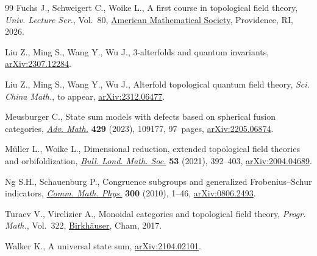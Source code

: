 \begin{thebibliography}{99}
Fuchs J., Schweigert C., Woike L., A first course in topological field theory,
 \textit{Univ. Lecture Ser.}, Vol.~80,
 \href{https://doi.org/10.1090/ulect/080}{American Mathematical Society},
 Providence, RI, 2026.

Liu Z., Ming S., Wang Y., Wu J., 3-alterfolds and quantum invariants,
 \href{http://arxiv.org/abs/2307.12284}{arXiv:2307.12284}.

Liu Z., Ming S., Wang Y., Wu J., Alterfold topological quantum field theory,
 \textit{Sci. China Math.}, {t}o appear,
 \href{http://arxiv.org/abs/2312.06477}{arXiv:2312.06477}.

Meusburger C., State sum models with defects based on spherical fusion
 categories, \href{https://doi.org/10.1016/j.aim.2023.109177}{\textit{Adv.
 Math.}} \textbf{429} (2023), 109177, 97~pages,
 \href{http://arxiv.org/abs/2205.06874}{arXiv:2205.06874}.

M\"uller L., Woike L., Dimensional reduction, extended topological field
 theories and orbifoldization,
 \href{https://doi.org/10.1112/blms.12427}{\textit{Bull. Lond. Math. Soc.}}
 \textbf{53} (2021), 392--403,
 \href{http://arxiv.org/abs/2004.04689}{arXiv:2004.04689}.

Ng S.H., Schauenburg P., Congruence subgroups and generalized
 {F}robenius--{S}chur indicators,
 \href{https://doi.org/10.1007/s00220-010-1096-6}{\textit{Comm. Math. Phys.}}
 \textbf{300} (2010), 1--46,
 \href{http://arxiv.org/abs/0806.2493}{arXiv:0806.2493}.

Turaev V., Virelizier A., Monoidal categories and topological field theory,
 \textit{Progr. Math.}, Vol.~322,
 \href{https://doi.org/10.1007/978-3-319-49834-8}{Birkh\"auser}, Cham, 2017.

Walker K., A universal state sum,
 \href{http://arxiv.org/abs/2104.02101}{arXiv:2104.02101}.

\end{thebibliography}

